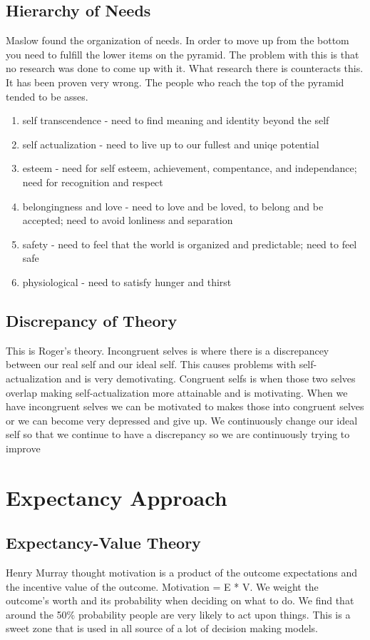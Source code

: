 \documentclass[12pt]{article}
\begin{document}
\subsection*{Hierarchy of Needs}
Maslow found the organization of needs. In order to move up from the bottom you need to fulfill the lower items on the pyramid. The problem with this is that no research was done to come up with it. What research there is counteracts this. It has been proven very wrong. The people who reach the top of the pyramid tended to be asses. 
\begin{enumerate}
\item self transcendence - need to find meaning and identity beyond the self
\item self actualization - need to live up to our fullest and uniqe potential
\item esteem - need for self esteem, achievement, compentance, and independance; need for recognition and respect
\item belongingness and love - need to love and be loved, to belong and be accepted; need to avoid lonliness and separation
\item safety - need to feel that the world is organized and predictable; need to feel safe
\item physiological - need to satisfy hunger and thirst
\end{enumerate}

\subsection*{Discrepancy of Theory}
This is Roger's theory. Incongruent selves is where there is a discrepancey between our real self and our ideal self. This causes problems with self-actualization and is very demotivating. Congruent selfs is when those two selves overlap making self-actualization more attainable and is motivating. When we have incongruent selves we can be motivated to makes those into congruent selves or we can become very depressed and give up. We continuously change our ideal self so that we continue to have a discrepancy so we are continuously trying to improve

\section*{Expectancy Approach}
\subsection*{Expectancy-Value Theory}
Henry Murray thought motivation is a product of the outcome expectations and the incentive value of the outcome. Motivation = E * V. We weight the outcome's worth and its probability when deciding on what to do. We find that around the 50\% probability people are very likely to act upon things. This is a sweet zone that is used in all source of a lot of decision making models.
\end{document}
